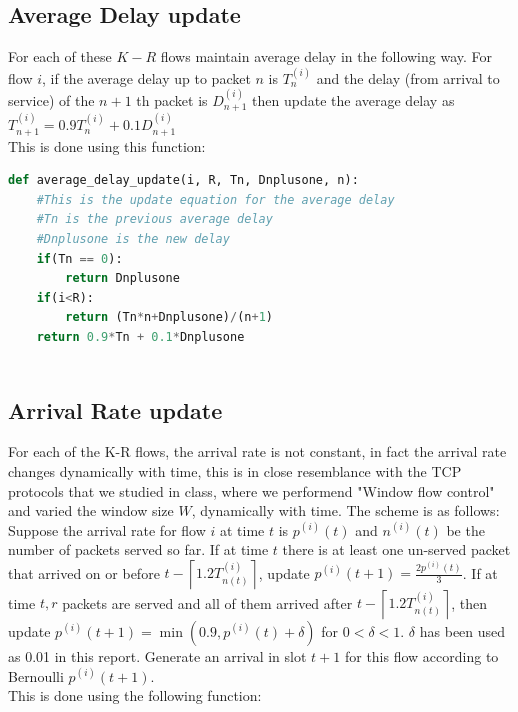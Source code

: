 \documentclass[11pt, a4paper]{article}
\begin{document}
\subsection{Average Delay update}
For each of these $K-R$ flows maintain average delay in the following way. For flow $i$, if the average delay up to packet $n$ is $T_n^{(i)}$ and the delay (from arrival to service) of the $n+1$ th packet is $D_{n+1}^{(i)}$ then update the average delay as $T_{n+1}^{(i)}=0.9 T_n^{(i)}+0.1 D_{n+1}^{(i)}$
\\
This is done using this function:
\\
\begin{lstlisting}[language = Python]
def average_delay_update(i, R, Tn, Dnplusone, n):
    #This is the update equation for the average delay
    #Tn is the previous average delay
    #Dnplusone is the new delay
    if(Tn == 0):
        return Dnplusone
    if(i<R):
        return (Tn*n+Dnplusone)/(n+1)
    return 0.9*Tn + 0.1*Dnplusone
    
\end{lstlisting}

\subsection{Arrival Rate update}
For each of the K-R flows, the arrival rate is not constant, in fact the arrival rate changes dynamically with time, this is in close resemblance with the TCP protocols that we studied in class, where we performend "Window flow control" and varied the window size $W$, dynamically with time. 
The scheme is as follows:\\
Suppose the arrival rate for flow $i$ at time $t$ is $p^{(i)}(t)$ and $n^{(i)}(t)$ be the number of packets served so far. If at time $t$ there is at least one un-served packet that arrived on or before $t-\left\lceil 1.2 T_{n(t)}^{(i)}\right\rceil$, update $p^{(i)}(t+1)=\frac{2 p^{(i)}(t)}{3}$. If at time $t, r$ packets are served and all of them arrived after $t-\left\lceil 1.2 T_{n(t)}^{(i)}\right\rceil$, then update $p^{(i)}(t+1)=\min \left(0.9, p^{(i)}(t)+\delta\right)$ for $0<\delta<1$. $\delta$ has been used as 0.01 in this report. Generate an arrival in slot $t+1$ for this flow according to Bernoulli $p^{(i)}(t+1)$.
\\
This is done using the following function:\\
\end{document}
